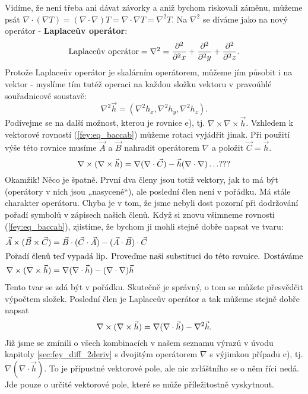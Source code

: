 {    Vidíme, že není třeba ani dávat závorky a aniž bychom riskovali záměnu, můžeme psát \(\nabla 
    \cdot(\nabla T) = (\nabla\cdot\nabla)T = \nabla\cdot\nabla T = \nabla^2T\). Na \(\nabla^2\) se 
    díváme jako na nový operátor - \textbf{Laplaceův operátor}:
    \begin{equation}\label{fyz:eq241}
      \text{Laplaceův operátor} = \nabla^2 = \frac{\partial^2 }{\partial^2 x} + \frac{\partial^2 }{\partial^2 y} + \frac{\partial^2 }{\partial^2 z}.
    \end{equation}
    Protože Laplaceův operátor je skalárním operátorem, můžeme jím působit i na vektor - myslíme 
    tím tutéž operaci na každou složku vektoru v pravoúhlé souřadnicové soustavě:
    \begin{equation*}
      \nabla^2\vec{h} = (\nabla^2h_x, \nabla^2h_y, \nabla^2h_z).
    \end{equation*}
    Podívejme se na další možnost, kterou je rovnice e), tj. \(\nabla\times\nabla\times\vec{h}\). 
    Vzhledem k vektorové rovností (\ref{fey:eq_baccab}) můžeme rotaci vyjádřit jinak. Při použití 
    výše této rovnice 
    musíme \(\vec{A}\) a \(\vec{B}\) nahradit operátorem \(\nabla\) a položit \(\vec{C} = \vec{h}\).
    \begin{equation*}
      \nabla\times(\nabla\times\vec{h}) = \nabla(\nabla\cdot\vec{C}) - \vec{h}(\nabla\cdot\nabla) \ldots ???
    \end{equation*}
    Okamžik! Něco je špatně. První dva členy jsou totiž vektory, jak to má být (operátory v nich 
    jsou „nasycené“), ale poslední člen není v pořádku. Má stále charakter operátoru. Chyba je v 
    tom, že jsme nebyli dost pozorní při dodržování pořadí symbolů v zápisech našich členů. Když si 
    znovu všimneme rovnosti (\ref{fey:eq_baccab}), zjistíme, že bychom ji mohli stejně dobře napsat 
    ve tvaru:
    \begin{align*}
      \vec{A}\times(\vec{B}\times\vec{C}) 
        &= \vec{B}\cdot(\vec{C}\cdot\vec{A}) - (\vec{A}\cdot\vec{B})\cdot\vec{C}  \\
      \shortintertext{Pořadí členů teď vypadá lip. Proveďme naši substituci do této rovnice. Dostáváme} 
      \nabla\times(\nabla\times\vec{h})
        &= \nabla(\nabla\cdot\vec{h}) - (\nabla\cdot\nabla)\vec{h} 
    \end{align*}
    Tento tvar se zdá být v pořádku. Skutečně je správný, o tom se můžete přesvědčit výpočtem 
    složek. Poslední člen je Laplaceův operátor a tak můžeme stejně dobře napsat
    \begin{equation*}
      \nabla\times(\nabla\times\vec{h}) = \nabla(\nabla\cdot\vec{h}) - \nabla^2\vec{h}.
    \end{equation*}
    Již jsme se zmínili o všech kombinacích v našem seznamu výrazů v úvodu kapitoly  
    \ref{sec:fey_diff_2deriv} s dvojitým operátorem \(\nabla\) s výjimkou případu c), 
    tj.\(\nabla(\nabla\cdot\vec{h})\). To je přípustné vektorové pole, ale nic zvláštního se o něm 
    říci nedá. Jde pouze o určité vektorové pole, které se může příležitostně vyskytnout.

}
